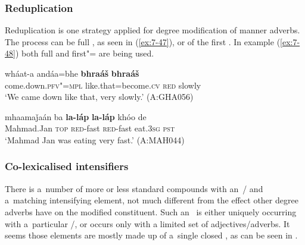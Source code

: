 \subsubsection*{Reduplication}

Reduplication is one strategy applied for degree modification of manner adverbs. The process can be
full , as seen in (\ref{ex:7-47}), or  of the first . In example
(\ref{ex:7-48}) both full and first"=  are being used.

\begin{exe}
\ex
\label{ex:7-47}
\gll wháat-a andáa=bhe \textbf{bhraáš} \textbf{bhraáš} \\
come.down.\textsc{pfv"=mpl} like.that=become.\textsc{cv} \textsc{red} slowly  \\
\glt `We came down like that, very slowly.' (A:GHA056)
\end{exe}
\begin{exe}
\ex
\label{ex:7-48}
\gll mhaamaǰaán ba \textbf{la-láp} \textbf{la-láp} khóo de \\
Mahmad.Jan \textsc{top} \textsc{red}-fast \textsc{red}-fast eat.\textsc{3sg} \textsc{pst } \\
\glt `Mahmad Jan was eating very fast.' (A:MAH044)
\end{exe}

\subsubsection*{Co-lexicalised intensifiers}

There is a~number of more or less standard compounds with an~/ and a~matching intensifying
element, not much different from the effect
other degree adverbs have on the modified constituent. Such an~ is either uniquely occurring with a~particular /, or occurs only with a limited set of adjectives/adverbs. It seems those elements are mostly made up of a~single closed , as can be seen in .


